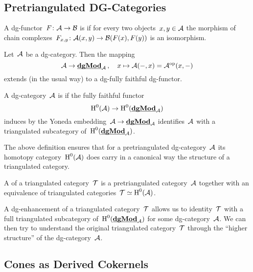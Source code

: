 \documentclass[a4paper,10pt]{scrartcl}
\begin{document}
\subsection{Pretriangulated DG-Categories}

\begin{definition}
  A dg-functor~$F \colon \mathcal{A} \to \mathcal{B}$ is  if for every two objects~$x, y \in \mathcal{A}$ the morphism of chain complexes~$F_{x,y} \colon \mathcal{A}(x,y) \to \mathcal{B}(F(x), F(y))$ is an isomorphism.
\end{definition}

\begin{proposition}
  Let~$\mathcal{A}$ be a dg-category.
  Then the mapping
  \[
    \mathcal{A}
    \to
    \underline{\smash{\mathbf{dgMod}}}_{\mathcal{A}} \,,
    \quad
    x
    \mapsto
    \mathcal{A}(-,x)
    =
    \mathcal{A}^{{\mathrm{op}}}(x,-)
  \]
  extends (in the usual way) to a dg-fully faithful dg-functor.
\end{proposition}

\begin{definition}
  A dg-category~$\mathcal{A}$ is  if the fully faithful {\klinear} functor
  \[
    \operatorname{H}^0(\mathcal{A})
    \to
    \operatorname{H}^0(\underline{\smash{\mathbf{dgMod}}}_{\mathcal{A}})
  \]
  induces by the Yoneda embedding~$\mathcal{A} \to \underline{\smash{\mathbf{dgMod}}}_{\mathcal{A}}$ identifies~$\mathcal{A}$ with a triangulated subcategory of~$\operatorname{H}^0(\underline{\smash{\mathbf{dgMod}}}_{\mathcal{A}})$.
\end{definition}

The above definition ensures that for a pretriangulated dg-category~$\mathcal{A}$ its homotopy category~$\operatorname{H}^0(\mathcal{A})$ does carry in a canonical way the structure of a triangulated category.

\begin{definition}
  A  of a triangulated category~$\mathcal{T}$ is a pretriangulated category~$\mathcal{A}$ together with an equivalence of triangulated categories~$\mathcal{T} \simeq \operatorname{H}^0(\mathcal{A})$.
\end{definition}


A dg-enhancement of a triangulated category~$\mathcal{T}$ allows us to identity~$\mathcal{T}$ with a full triangulated subcategory of~$\operatorname{H}^0(\underline{\smash{\mathbf{dgMod}}}_{\mathcal{A}})$ for some dg-category~$\mathcal{A}$.
We can then try to understand the original triangulated category~$\mathcal{T}$ through the \enquote{higher structure} of the dg-category~$\mathcal{A}$.



\subsection{Cones as Derived Cokernels}
\end{document}
